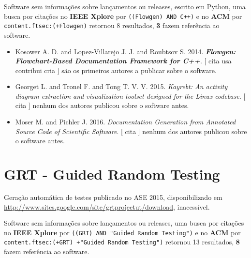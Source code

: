 Software sem informações sobre lançamentos ou releases,
escrito em Python,
uma busca por citações no {\bf IEEE Xplore} por
\texttt{((Flowgen) AND C++)}
e no {\bf ACM} por
\texttt{content.ftsec:(+Flowgen)}
retornou
8 resultados,
{\bf 3} fazem referência ao software.

\begin{itemize}
\item Kosower A. D. and Lopez-Villarejo J. J. and Roubtsov S.
      2014.
        \textbf{\textit{ Flowgen: Flowchart-Based Documentation Framework for C++}}.
      [
          cita
          usa
          contribui
          cria
      ]
são os primeiros autores a publicar sobre o software.
\item Georget L. and Tronel F. and Tong T. V. V.
      2015.
        \textit{ Kayrebt: An activity diagram extraction and visualization toolset designed for the Linux codebase}.
      [
          cita
      ]
nenhum dos autores publicou sobre o software antes.
\item Moser M. and Pichler J.
      2016.
        \textit{ Documentation Generation from Annotated Source Code of Scientific Software}.
      [
          cita
      ]
nenhum dos autores publicou sobre o software antes.
\end{itemize}
\section{GRT - Guided Random Testing}

Geração automática de testes
publicado no ASE 2015,
disponibilizado em \url{http://www.sites.google.com/site/grtprojectut/download},
inacessível.

Software sem informações sobre lançamentos ou releases,
uma busca por citações no {\bf IEEE Xplore} por
\texttt{((GRT) AND "Guided Random Testing")}
e no {\bf ACM} por
\texttt{content.ftsec:(+GRT) +"Guided Random Testing")}
retornou
13 resultados,
{\bf 8} fazem referência ao software.

